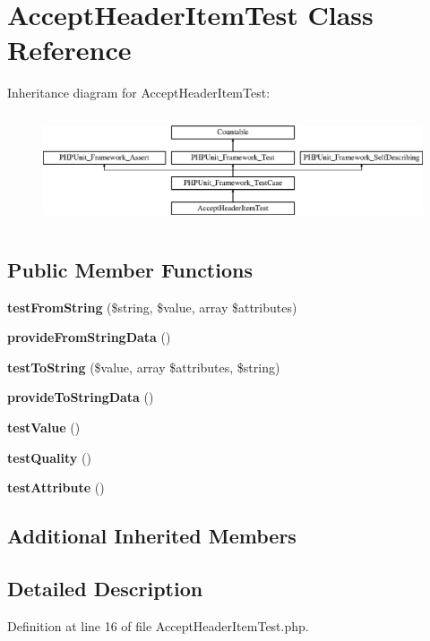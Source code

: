 \section{Accept\+Header\+Item\+Test Class Reference}
\label{class_symfony_1_1_component_1_1_http_foundation_1_1_tests_1_1_accept_header_item_test}
Inheritance diagram for Accept\+Header\+Item\+Test\+:\begin{figure}[H]
\begin{center}
\leavevmode
\includegraphics[height=3.303835cm]{class_symfony_1_1_component_1_1_http_foundation_1_1_tests_1_1_accept_header_item_test}
\end{center}
\end{figure}
\subsection*{Public Member Functions}
\begin{DoxyCompactItemize}
\item 
{\bf test\+From\+String} (\$string, \$value, array \$attributes)
\item 
{\bf provide\+From\+String\+Data} ()
\item 
{\bf test\+To\+String} (\$value, array \$attributes, \$string)
\item 
{\bf provide\+To\+String\+Data} ()
\item 
{\bf test\+Value} ()
\item 
{\bf test\+Quality} ()
\item 
{\bf test\+Attribute} ()
\end{DoxyCompactItemize}
\subsection*{Additional Inherited Members}


\subsection{Detailed Description}


Definition at line 16 of file Accept\+Header\+Item\+Test.\+php.



